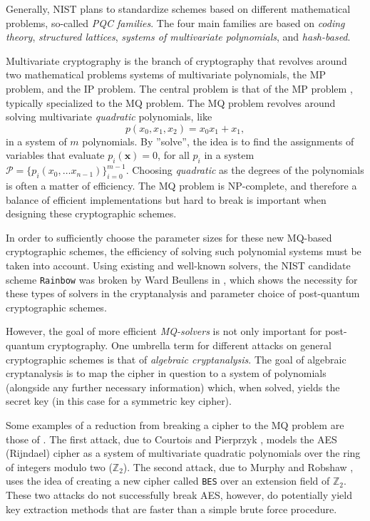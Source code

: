 Generally, NIST plans to standardize schemes based on different mathematical problems, so-called \textit{PQC families}. The four main families are based on \textit{coding theory}, \textit{structured lattices}, \textit{systems of multivariate polynomials}, and \textit{hash-based}.

Multivariate cryptography is the branch of cryptography that revolves around two mathematical problems systems of multivariate polynomials, the MP problem, and the IP problem. The central problem is that of the MP problem \cite{ding2020}, typically specialized to the MQ problem. The MQ problem revolves around solving multivariate \textit{quadratic} polynomials, like 
$$
    p(x_0,x_1,x_2) = x_0x_1 + x_1,
$$
in a system of $m$ polynomials. By ''solve'', the idea is to find the assignments of variables that evaluate $p_i(\mathbf{x}) = 0$, for all $p_i$ in a system $\mathcal{P} = \{p_i(x_{0}, \dots x_{n - 1})\}_{i = 0}^{m - 1}$. Choosing \textit{quadratic} as the degrees of the polynomials is often a matter of efficiency. The MQ problem is NP-complete, and therefore a balance of efficient implementations but hard to break is important when designing these cryptographic schemes.

In order to sufficiently choose the parameter sizes for these new MQ-based cryptographic schemes, the efficiency of solving such polynomial systems must be taken into account. Using existing and well-known solvers, the NIST candidate scheme \texttt{Rainbow} was broken by Ward Beullens in \cite{crypto-2022-32130}, which shows the necessity for these types of solvers in the cryptanalysis and parameter choice of post-quantum cryptographic schemes.

However, the goal of more efficient \textit{MQ-solvers} is not only important for post-quantum cryptography. One umbrella term for different attacks on general cryptographic schemes is that of \textit{algebraic cryptanalysis}. The goal of algebraic cryptanalysis is to map the cipher in question to a system of polynomials (alongside any further necessary information) which, when solved, yields the secret key (in this case for a symmetric key cipher).

Some examples of a reduction from breaking a cipher to the MQ problem are those of \cite{nover2005algebraic}. The first attack, due to Courtois and Pierprzyk \cite{courtois2002cryptanalysis}, models the AES (Rijndael) cipher as a system of multivariate quadratic polynomials over the ring of integers modulo two ($\mathbb{Z}_2$). The second attack, due to Murphy and Robshaw \cite{crypto-2002-1565}, uses the idea of creating a new cipher called \texttt{BES} over an extension field of $\mathbb{Z}_2$. These two attacks do not successfully break AES, however, do potentially yield key extraction methods that are faster than a simple brute force procedure.

